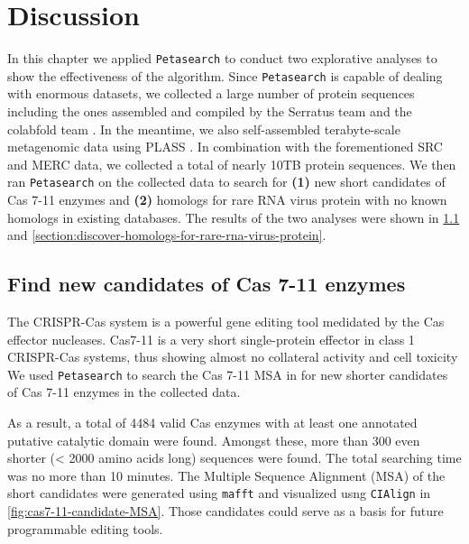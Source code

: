 \chapter{Discussion} \label{chapter:discussion}




In this chapter we applied \texttt{Petasearch} to conduct two explorative analyses to show the effectiveness of the algorithm. Since \texttt{Petasearch} is capable of dealing with enormous datasets, we collected a large number of protein sequences including the ones assembled and compiled by the Serratus team \cite{edgar_petabase-scale_2022}
and the colabfold team \cite{mirdita_colabfold_2022}.
In the meantime, we also self-assembled terabyte-scale metagenomic data using PLASS \cite{steinegger_protein-level_2019}. In combination with the forementioned SRC and MERC data, we collected a total of nearly 10TB protein sequences. We then ran \texttt{Petasearch} on the collected data to search for \textbf{(1)} new short candidates of Cas 7-11 enzymes and \textbf{(2)} homologs for rare RNA virus protein with no known homologs in existing databases. The results of the two analyses were shown in \cref{section:find-new-candidates-of-cas-7-11-enzymes} and \cref{section:discover-homologs-for-rare-rna-virus-protein}.

\section{Find new candidates of Cas 7-11 enzymes} \label{section:find-new-candidates-of-cas-7-11-enzymes}

The CRISPR-Cas system is a powerful gene editing tool medidated by the Cas effector nucleases. Cas7-11 is a very short single-protein effector in class 1 CRISPR-Cas systems, thus showing almost no collateral activity and cell toxicity \cite{ozcan_programmable_2021}
We used \texttt{Petasearch} to search the Cas 7-11 MSA in \cite{ozcan_programmable_2021}
for new shorter candidates of Cas 7-11 enzymes in the collected data.

As a result, a total of 4484 valid Cas enzymes with at least one annotated putative catalytic domain were found. Amongst these, more than 300 even shorter (< 2000 amino acids long) sequences were found. The total searching time was no more than 10 minutes. The Multiple Sequence Alignment (MSA) of the short candidates were generated using \texttt{mafft} \cite{katoh_mafft_2013} and visualized usng \texttt{CIAlign} \cite{tumescheit_cialign_2022} in \cref{fig:cas7-11-candidate-MSA}. Those candidates could serve as a basis for future programmable editing tools.

